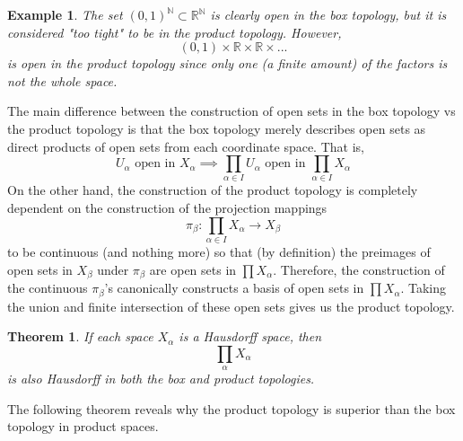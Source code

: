 \documentclass{article}
\newtheorem{theorem}{Theorem}[section]
\newtheorem{example}{Example}[section]
\theoremstyle{remark}
\theoremstyle{definition}
\begin{document}
\begin{example}
The set $(0,1)^\mathbb{N} \subset \mathbb{R}^\mathbb{N}$ is clearly open in the box topology, but it is considered "too tight" to be in the product topology. However, 
\[(0,1) \times \mathbb{R} \times \mathbb{R} \times ... \]
is open in the product topology since only one (a finite amount) of the factors is not the whole space. 
\end{example}

The main difference between the construction of open sets in the box topology vs the product topology is that the box topology merely describes open sets as direct products of open sets from each coordinate space. That is,
\[U_\alpha \text{ open in } X_\alpha \implies \prod_{\alpha \in I} U_\alpha \text{ open in } \prod_{\alpha \in I} X_\alpha\]
On the other hand, the construction of the product topology is completely dependent on the construction of the projection mappings 
\[ \pi_\beta: \prod_{\alpha \in I} X_\alpha \longrightarrow X_\beta\]
to be continuous (and nothing more) so that (by definition) the preimages of open sets in $X_\beta$ under $\pi_\beta$ are open sets in $\prod X_\alpha$. Therefore, the construction of the continuous $\pi_\beta$'s canonically constructs a basis of open sets in $\prod X_\alpha$. Taking the union and finite intersection of these open sets gives us the product topology. 

\begin{theorem}
If each space $X_\alpha$ is a Hausdorff space, then 
\[\prod_{\alpha} X_\alpha\]
is also Hausdorff in both the box and product topologies. 
\end{theorem}

The following theorem reveals why the product topology is superior than the box topology in product spaces. 
\end{document}
